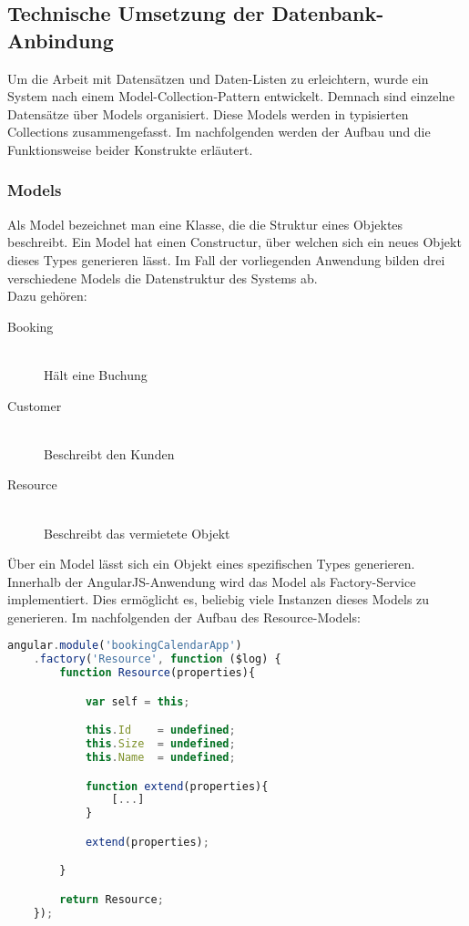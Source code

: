 \subsection{Technische Umsetzung der Datenbank-Anbindung}
Um die Arbeit mit Datensätzen und Daten-Listen zu erleichtern, wurde ein System nach einem Model-Collection-Pattern entwickelt.
Demnach sind einzelne Datensätze über Models organisiert. Diese Models werden in typisierten Collections zusammengefasst.
Im nachfolgenden werden der Aufbau und die Funktionsweise beider Konstrukte erläutert.

\subsubsection{Models}

Als Model bezeichnet man eine Klasse, die die Struktur eines Objektes beschreibt. Ein Model hat einen Constructur, über welchen sich ein neues Objekt dieses Types generieren lässt.
Im Fall der vorliegenden Anwendung bilden drei verschiedene Models die Datenstruktur des Systems ab.\\
Dazu gehören:
\begin{description}
\item[Booking]\hfill \\
Hält eine Buchung
\item[Customer]\hfill \\
Beschreibt den Kunden
\item[Resource]\hfill \\
Beschreibt das vermietete Objekt
\end{description}

Über ein Model lässt sich ein Objekt eines spezifischen Types generieren.
Innerhalb der AngularJS-Anwendung wird das Model als Factory-Service implementiert. Dies ermöglicht es, beliebig viele Instanzen dieses Models zu generieren.
Im nachfolgenden der Aufbau des Resource-Models:

\begin{lstlisting}[language=Javascript, label=code_ResourceModel, caption=Hauptteil des Reosurce-Models]
angular.module('bookingCalendarApp')
    .factory('Resource', function ($log) {
        function Resource(properties){

            var self = this;

            this.Id    = undefined;
            this.Size  = undefined;
            this.Name  = undefined;

            function extend(properties){
                [...]
            }

            extend(properties);

        }

        return Resource;
    });
\end{lstlisting}

